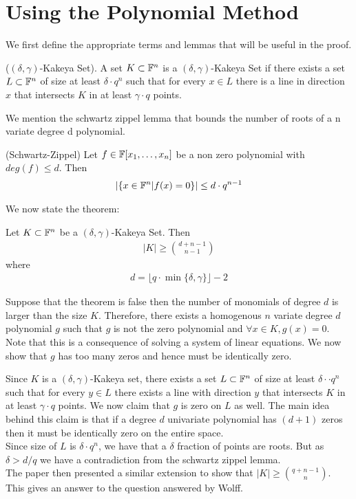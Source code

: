 \section{Using the Polynomial Method}
We first define the appropriate terms and lemmas that will be useful in the proof.
\begin{definition}
	($(\delta, \gamma)$-Kakeya Set). A set $K \subset {\mathbb{F}}^n$ is a $(\delta,\gamma)$-Kakeya Set if there exists a set $L \subset {\mathbb{F}}^n$ of size at least $\delta \cdot q^n$ such that for every $x \in L$ there is a line in direction $x$ that intersects $K$ in at least $\gamma \cdot q$ points.
\end{definition}
We mention the schwartz zippel lemma that bounds the number of roots of a n variate degree d polynomial.
\begin{lemma}
	(Schwartz-Zippel) Let $f \in {\mathbb{F}}[x_1 , \ldots , x_n]$ be a non zero polynomial with $deg(f) \leq d$. Then
	\begin{align*}
		|\{x \in {\mathbb{F}}^n | f(x) = 0 \}| \leq d \cdot q^{n-1}
	\end{align*}
\end{lemma}
We now state the theorem:
\begin{theorem}
	Let $K \subset {\mathbb{F}}^n$ be a $(\delta, \gamma)$-Kakeya Set. Then
	\begin{align*}
		|K| \geq \binom{d+n-1}{n-1}
	\end{align*}
	where
	\begin{align*}
		d = \lfloor q \cdot \min{\{\delta,\gamma\}} \rfloor - 2
	\end{align*}
\end{theorem}
Suppose that the theorem is false then the number of monomials of degree $d$ is larger than the size $K$. Therefore, there exists a homogenous $n$ variate degree $d$ polynomial $g$ such that $g$ is not the zero polynomial and $\forall x \in K, g(x) = 0$. Note that this is a consequence of solving a system of linear equations. We now show that $g$ has too many zeros and hence must be identically zero.
\\
\begin{comment}
Consider the set
\begin{align*}
	K' = \{c \cdot x | x \in K, c \in \F \}
\end{align*}
Since $g$ is zero on $K$ and it is a homogenous polynomial we have that $g$ is zero on $K'$.
\\
\end{comment}
Since $K$ is a $(\delta, \gamma)$-Kakeya set, there exists a set $L \subset {\mathbb{F}}^n$ of size at least $\delta ·\cdot q^n$ such that for every $y \in L$ there exists a line with direction $y$ that intersects $K$ in at least $\gamma \cdot q$ points. We now claim that $g$ is zero on $L$ as well. The main idea behind this claim is that if a degree $d$ univariate polynomial has $(d+1)$ zeros then it must be identically zero on the entire space.
\\
Since size of $L$ is $\delta \cdot q^n$, we have that a $\delta$ fraction of points are roots. But as $\delta > d/q$ we have a contradiction from the schwartz zippel lemma.
\\
The paper then presented a similar extension to show that $|K| \geq \binom{q+n-1}{n}$. This gives an answer to the question answered by Wolff. 